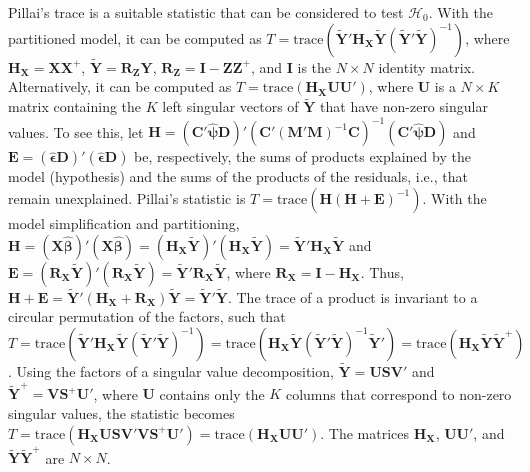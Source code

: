 Pillai's trace \citep{Pillai1955} is a suitable statistic that can be considered to test $\mathcal{H}_0$. With the partitioned model, it can be computed as $T=\text{trace}(\tilde{\mathbf{Y}}'\mathbf{H}_{\mathbf{X}}\tilde{\mathbf{Y}}(\tilde{\mathbf{Y}}'\tilde{\mathbf{Y}})^{-1})$, where $\mathbf{H}_\mathbf{X}=\mathbf{X}\mathbf{X}^{+}$, $\tilde{\mathbf{Y}}=\mathbf{R}_{\mathbf{Z}}\mathbf{Y}$, $\mathbf{R}_{\mathbf{Z}}=\mathbf{I}-\mathbf{Z}\mathbf{Z}^{+}$, and $\mathbf{I}$ is the $N \times N$ identity matrix. Alternatively, it can be computed as $T=\text{trace}(\mathbf{H}_\mathbf{X}\mathbf{U}\mathbf{U}')$, where $\mathbf{U}$ is a $N \times K$ matrix containing the $K$ left singular vectors of $\tilde{\mathbf{Y}}$ that have non-zero singular values. To see this, let $\mathbf{H} = (\mathbf{C}'\boldsymbol{\hat{\psi}}\mathbf{D})' \left(\mathbf{C}'(\mathbf{M}'\mathbf{M})^{-1}\mathbf{C} \right)^{-1} (\mathbf{C}'\boldsymbol{\hat{\psi}}\mathbf{D})$ and $\mathbf{E} = (\boldsymbol{\hat{\epsilon}}\mathbf{D})'(\boldsymbol{\hat{\epsilon}}\mathbf{D})$ be, respectively, the sums of products explained by the model (hypothesis) and the sums of the products of the residuals, i.e., that remain unexplained. Pillai's statistic is $T=\text{trace}\left(\mathbf{H}(\mathbf{H}+\mathbf{E})^{-1}\right)$. With the model simplification and partitioning, $\mathbf{H}= ( \mathbf{X}\boldsymbol{\hat{\beta}})'(\mathbf{X}\boldsymbol{\hat{\beta}}) = (\mathbf{H}_{\mathbf{X}}\tilde{\mathbf{Y}})'(\mathbf{H}_{\mathbf{X}}\tilde{\mathbf{Y}}) = \tilde{\mathbf{Y}}'\mathbf{H}_{\mathbf{X}}\tilde{\mathbf{Y}}$ and $\mathbf{E} = (\mathbf{R}_{\mathbf{X}}\tilde{\mathbf{Y}})'(\mathbf{R}_{\mathbf{X}}\tilde{\mathbf{Y}}) = \tilde{\mathbf{Y}}'\mathbf{R}_{\mathbf{X}}\tilde{\mathbf{Y}}$, where $\mathbf{R}_{\mathbf{X}} = \mathbf{I} - \mathbf{H}_{\mathbf{X}}$. Thus, $\mathbf{H}+\mathbf{E}= \tilde{\mathbf{Y}}'(\mathbf{H}_{\mathbf{X}} + \mathbf{R}_{\mathbf{X}})\tilde{\mathbf{Y}} = \tilde{\mathbf{Y}}'\tilde{\mathbf{Y}}$. The trace of a product is invariant to a circular permutation of the factors, such that $T = \text{trace}(\tilde{\mathbf{Y}}'\mathbf{H}_{\mathbf{X}}\tilde{\mathbf{Y}}(\tilde{\mathbf{Y}}'\tilde{\mathbf{Y}})^{-1})=\text{trace}(\mathbf{H}_{\mathbf{X}}\tilde{\mathbf{Y}}(\tilde{\mathbf{Y}}'\tilde{\mathbf{Y}})^{-1}\tilde{\mathbf{Y}}')=\text{trace}(\mathbf{H}_{\mathbf{X}}\tilde{\mathbf{Y}}\tilde{\mathbf{Y}}^{+})$. Using the factors of a singular value decomposition, $\tilde{\mathbf{Y}} = \mathbf{U}\mathbf{S}\mathbf{V}'$ and $\tilde{\mathbf{Y}}^{+} = \mathbf{V}\mathbf{S}^{+}\mathbf{U}'$, where $\mathbf{U}$ contains only the $K$ columns that correspond to non-zero singular values, the statistic becomes $T = \text{trace}(\mathbf{H}_{\mathbf{X}}
\mathbf{U}\mathbf{S}\mathbf{V}' \mathbf{V}\mathbf{S}^{+}\mathbf{U}') = \text{trace}(\mathbf{H}_{\mathbf{X}}
\mathbf{U}\mathbf{U}')$. The matrices $\mathbf{H}_{\mathbf{X}}$, $\mathbf{U}\mathbf{U}'$, and $\tilde{\mathbf{Y}}\tilde{\mathbf{Y}}^{+}$ are $N \times N$.

